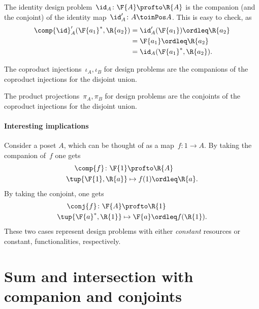 \begin{example}
  The identity design problem~$\id_A\colon \F{A} \profto \R{A}$ is the companion (and the conjoint) of the identity map~$\id_A'\colon A \toinPos A$. This is easy to check, as
  \begin{equation}
    \begin{aligned}
      \comp{\id}_A'(\F{a_1}^*,\R{a_2})&=\id_A'(\F{a_1})\ordleq \R{a_2}\\
      &=\F{a_1}\ordleq \R{a_2}\\
      &=\id_A(\F{a_1}^*,\R{a_2}).
    \end{aligned}
  \end{equation}
\end{example}

\begin{example}
  The coproduct injections~$\iota_A, \iota_B$ for design problems are the companions of the coproduct injections for the disjoint union.
\end{example}

\begin{example}
  The product projections~$\pi_A, \pi_B$ for design problems are the conjoints of the coproduct injections for the disjoint union.
\end{example}

\paragraph{Interesting implications}
Consider a poset $A$, which can be thought of as a map~$f\colon 1\to A$. By taking the companion of~$f$ one gets
\begin{equation}
  \begin{aligned}
    \comp{f}\colon \F{1}&\profto \R{A}\\
    \tup{\F{1},\R{a}}&\mapsto f(1)\ordleq \R{a}.
  \end{aligned}
\end{equation}
By taking the conjoint, one gets
\begin{equation}
  \begin{aligned}
    \conj{f}\colon \F{A}&\profto \R{1}\\
    \tup{\F{a}^*,\R{1}}&\mapsto \F{a}\ordleq f(\R{1}).
  \end{aligned}
\end{equation}
These two cases represent design problems with either \emph{constant} resources or constant, functionalities, respectively.

\section{Sum and intersection with companion and conjoints}

